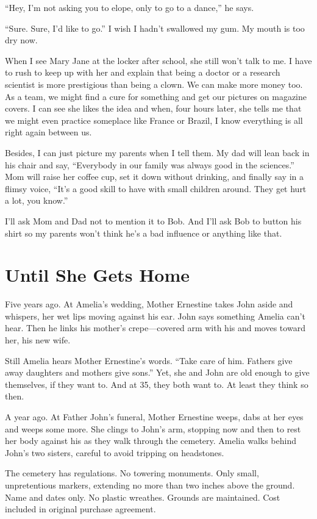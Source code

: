 \documentclass[twoside,10pt]{book}
\begin{document}
``Hey, I'm not asking you to elope, only to go to a dance,'' he says.

``Sure. Sure, I'd like to go.'' I wish I hadn't swallowed my gum. My
mouth is too dry now.

When I see Mary Jane at the locker after school, she still won't talk to
me. I have to rush to keep up with her and explain that being a doctor
or a research scientist is more prestigious than being a clown. We can
make more money too. As a team, we might find a cure for something and
get our pictures on magazine covers. I can see she likes the idea and
when, four hours later, she tells me that we might even practice
someplace like France or Brazil, I know everything is all right again
between us.

Besides, I can just picture my parents when I tell them. My dad will
lean back in his chair and say, ``Everybody in our family was always
good in the sciences.'' Mom will raise her coffee cup, set it down
without drinking, and finally say in a flimsy voice, ``It's a good skill
to have with small children around. They get hurt a lot, you know.''

I'll ask Mom and Dad not to mention it to Bob. And I'll ask Bob to
button his shirt so my parents won't think he's a bad influence or
anything like that.



\cleardoublepage
\chapter{Until She Gets Home}

Five years ago. At Amelia's wedding, Mother Ernestine takes John aside
and whispers, her wet lips moving against his ear. John says something
Amelia can't hear. Then he links his mother's crepe---covered arm with
his and moves toward her, his new wife.

Still Amelia hears Mother Ernestine's words. ``Take care of him. Fathers
give away daughters and mothers give sons.'' Yet, she and John are old
enough to give themselves, if they want to. And at 35, they both want
to. At least they think so then.

A year ago. At Father John's funeral, Mother Ernestine weeps, dabs at
her eyes and weeps some more. She clings to John's arm, stopping now and
then to rest her body against his as they walk through the cemetery.
Amelia walks behind John's two sisters, careful to avoid tripping on
headstones.

The cemetery has regulations. No towering monuments. Only small,
unpretentious markers, extending no more than two inches above the
ground. Name and dates only. No plastic wreathes. Grounds are
maintained. Cost included in original purchase agreement.
\end{document}
